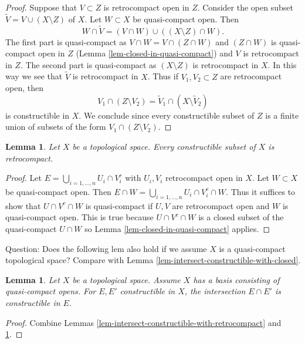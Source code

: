 \documentclass{ujarticle}
\newtheorem{lem}[thm]{Lemma}
\begin{document}
\begin{proof}
Suppose that $V \subset Z$ is retrocompact open in $Z$. Consider the open
subset $\tilde V = V \cup (X \setminus Z)$ of $X$. Let $W \subset X$ be
quasi-compact open. Then
$$
W \cap \tilde V =
\left(V \cap W\right) \cup \left((X \setminus Z) \cap W\right).
$$
The first part is quasi-compact as $V \cap W = V \cap (Z \cap W)$ and
$(Z \cap W)$ is quasi-compact open in $Z$
(Lemma \ref{lem-closed-in-quasi-compact}) and $V$ is retrocompact in $Z$.
The second part is quasi-compact as $(X \setminus Z)$ is retrocompact in $X$.
In this way we see that $\tilde V$ is retrocompact in $X$.
Thus if $V_1, V_2 \subset Z$ are retrocompact open, then
$$
V_1 \cap (Z \setminus V_2) = \tilde V_1 \cap (X \setminus \tilde V_2)
$$
is constructible in $X$. We conclude since every constructible subset of $Z$
is a finite union of subsets of the form $V_1 \cap (Z \setminus V_2)$.
\end{proof}

\begin{lem}
\label{lem-constructible-is-retrocompact}
Let $X$ be a topological space. Every constructible
subset of $X$ is retrocompact.
\end{lem}

\begin{proof}
Let $E = \bigcup_{i = 1, \ldots, n} U_i \cap V_i^c$ with $U_i, V_i$
retrocompact open in $X$. Let $W \subset X$ be quasi-compact open.
Then $E \cap W = \bigcup_{i = 1, \ldots, n} U_i \cap V_i^c \cap W$.
Thus it suffices to show that $U \cap V^c \cap W$ is quasi-compact
if $U, V$ are retrocompact open and $W$ is quasi-compact
open. This is true because $U \cap V^c \cap W$ is a closed
subset of the quasi-compact $U \cap W$ so
Lemma \ref{lem-closed-in-quasi-compact}
applies.
\end{proof}

\noindent
Question: Does the following lem also hold if we assume $X$ is a
quasi-compact topological space? Compare with
Lemma \ref{lem-intersect-constructible-with-closed}.

\begin{lem}
\label{lem-intersect-constructible-with-constructible}
Let $X$ be a topological space. Assume
$X$ has a basis consisting of quasi-compact opens.
For $E, E'$ constructible in $X$, the intersection
$E \cap E'$ is constructible in $E$.
\end{lem}

\begin{proof}
Combine Lemmas \ref{lem-intersect-constructible-with-retrocompact} and
\ref{lem-constructible-is-retrocompact}.
\end{proof}
\end{document}
